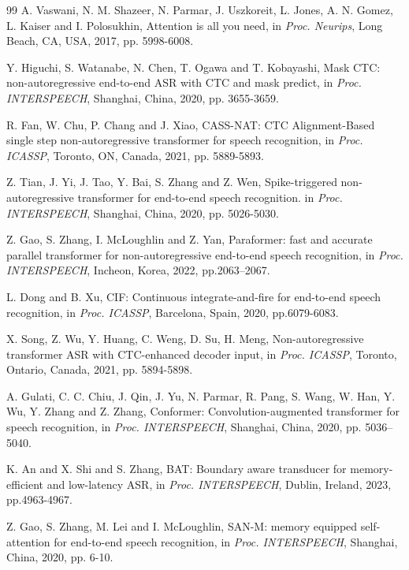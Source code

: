 \documentclass[runningheads]{llncs}
\begin{document}
\begin{thebibliography}{99}
 A. Vaswani, N. M. Shazeer, N. Parmar, J. Uszkoreit, L. Jones, A. N. Gomez, L. Kaiser and I. Polosukhin, Attention is all you need, in {\em Proc. Neurips}, Long Beach, CA, USA, 2017, pp. 5998-6008.

 Y. Higuchi, S. Watanabe, N. Chen, T. Ogawa and T. Kobayashi, Mask CTC: non-autoregressive end-to-end ASR with CTC and mask predict, in {\em Proc. INTERSPEECH}, Shanghai, China, 2020, pp. 3655-3659.

 R. Fan, W. Chu, P. Chang and J. Xiao, CASS-NAT: CTC Alignment-Based single step non-autoregressive transformer for speech recognition, in {\em Proc. ICASSP}, Toronto, ON, Canada, 2021, pp. 5889-5893.

 Z. Tian, J. Yi, J. Tao, Y. Bai, S. Zhang and Z. Wen, Spike-triggered non-autoregressive transformer for end-to-end speech recognition. in {\em Proc. INTERSPEECH}, Shanghai, China, 2020, pp. 5026-5030.

 Z. Gao, S. Zhang, I. McLoughlin and Z. Yan, Paraformer: fast and accurate parallel transformer for non-autoregressive end-to-end speech recognition,  in  {\em Proc. INTERSPEECH}, Incheon, Korea, 2022, pp.2063--2067.

 L. Dong and B. Xu, {CIF}: Continuous integrate-and-fire for end-to-end speech recognition, in {\em Proc. ICASSP}, Barcelona, Spain, 2020, pp.6079-6083.

 X. Song, Z. Wu, Y. Huang, C. Weng, D. Su, H. Meng, Non-autoregressive transformer ASR with CTC-enhanced decoder input, in {\em Proc. ICASSP}, Toronto, Ontario, Canada, 2021, pp. 5894-5898.

 A. Gulati, C. C. Chiu, J. Qin, J. Yu, N. Parmar, R. Pang, S. Wang, W. Han, Y. Wu, Y. Zhang and Z. Zhang, Conformer: Convolution-augmented transformer for speech recognition, in {\em Proc. INTERSPEECH}, Shanghai, China, 2020, pp. 5036--5040.

  K. An and X. Shi and S. Zhang, BAT: Boundary aware transducer for memory-efficient and low-latency ASR, in {\em Proc. INTERSPEECH}, Dublin, Ireland, 2023, pp.4963-4967.

 Z. Gao, S. Zhang, M. Lei and I. McLoughlin, SAN-M: memory equipped self-attention for end-to-end speech recognition, in {\em Proc. INTERSPEECH}, Shanghai, China, 2020, pp. 6-10.


\end{thebibliography}
\end{document}
